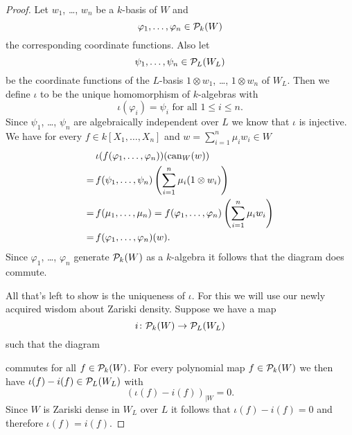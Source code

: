 \begin{proof}
  Let $w_1$, \dots, $w_n$ be a $k$-basis of $W$ and
  \[
    \varphi_1, \dotsc, \varphi_n \in \mathcal{P}_k(W)
  \]
  the corresponding coordinate functions. Also let
  \[
    \psi_1, \dotsc, \psi_n \in \mathcal{P}_L(W_L)
  \]
  be the coordinate functions of the $L$-basis $1 \otimes w_1$, \dots, $1 \otimes w_n$ of $W_L$. Then we define $\iota$ to be the unique homomorphism of $k$-algebras with
  \[
    \iota(\varphi_i) = \psi_i \text{ for all } 1 \leq i \leq n.
  \]
  Since $\psi_1$, \dots, $\psi_n$ are algebraically independent over $L$ we know that $\iota$ is injective. We have for every $f \in k[X_1, \dotsc, X_n]$ and $w = \sum_{i=1}^n \mu_i w_i \in W$
  \begin{align*}
      &\, \iota(f(\varphi_1, \dotsc, \varphi_n))(\operatorname{can}_W(w)) \\
    =&\, f(\psi_1, \dotsc, \psi_n)\left(\sum_{i=1}^n \mu_i (1 \otimes w_i)\right) \\
    =&\, f(\mu_1, \dotsc, \mu_n)
    = f(\varphi_1, \dotsc, \varphi_n)\left(\sum_{i=1}^n \mu_i w_i\right) \\
    =&\, f(\varphi_1, \dotsc, \varphi_n)(w).
  \end{align*}
  Since $\varphi_1$, \dots, $\varphi_n$ generate $\mathcal{P}_k(W)$ as a $k$-algebra it follows that the diagram does commute.
  
  All that’s left to show is the uniqueness of $\iota$. For this we will use our newly acquired wisdom about Zariski density. Suppose we have a map
  \[
    i \colon \mathcal{P}_k(W) \to \mathcal{P}_L(W_L)
  \]
  such that the diagram
    \begin{center}
  \end{center}
  commutes for all $f \in \mathcal{P}_k(W)$. For every polynomial map $f \in \mathcal{P}_k(W)$ we then have \mbox{$\iota(f)-i(f) \in \mathcal{P}_L(W_L)$} with
  \[
    \left( \iota(f)-i(f) \right)_{|W} = 0.
  \]
  Since $W$ is Zariski dense in $W_L$ over $L$ it follows that $\iota(f) - i(f) = 0$ and therefore $\iota(f) = i(f)$.
\end{proof}


